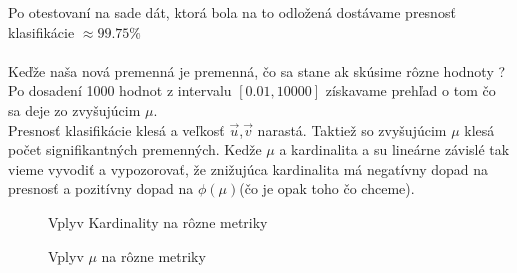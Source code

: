 \documentclass{article}
\begin{document}
Po otestovaní na sade dát, ktorá bola na to odložená dostávame presnosť klasifikácie $\approx 99.75\%$\\\\
Keďže naša nová premenná je premenná, čo sa stane ak skúsime rôzne hodnoty ?
Po dosadení 1000 hodnot z intervalu $[0.01,10000]$ získavame prehľad o tom čo sa deje zo zvyšujúcim $\mu$.\\ Presnosť klasifikácie klesá a veľkosť $\Vec{u}$,$\Vec{v}$ narastá. Taktiež so zvyšujúcim $\mu$ klesá počet signifikantných premenných. Kedže $\mu$ a kardinalita a su lineárne závislé tak vieme vyvodiť a vypozorovať, že znižujúca kardinalita má negatívny dopad na presnosť a pozitívny dopad na $\phi(\mu)$(čo je opak toho čo chceme).
\begin{figure}[h]%
    \centering
    \qquad
    \caption{Vplyv Kardinality na rôzne metriky}%
    \label{fig:kar}%
\end{figure} 
\begin{figure}[b]%
    \centering
    \qquad
    \caption{Vplyv $\mu$ na rôzne metriky}%
    \label{fig:mu}%
\end{figure}
\end{document}
